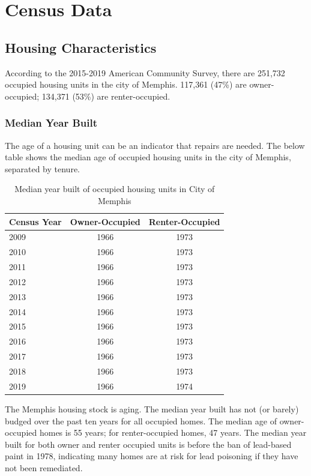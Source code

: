 \documentclass[
]{book}
\begin{document}
\hypertarget{census-data}{%
\chapter{Census Data}\label{census-data}}

\hypertarget{housing-characteristics}{%
\section{Housing Characteristics}\label{housing-characteristics}}

According to the 2015-2019 American Community Survey, there are 251,732 occupied housing units in the city of Memphis. 117,361 (47\%) are owner-occupied; 134,371 (53\%) are renter-occupied.

\hypertarget{median-year-built}{%
\subsection{Median Year Built}\label{median-year-built}}

The age of a housing unit can be an indicator that repairs are needed. The below table shows the median age of occupied housing units in the city of Memphis, separated by tenure.

\begin{table}

\caption{\label{tab:tbl-medyrbltmem}Median year built of occupied housing units in City of Memphis}
\centering
\begin{tabular}[t]{l|c|c}
\hline
Census Year & Owner-Occupied & Renter-Occupied\\
\hline
2009 & 1966 & 1973\\
\hline
2010 & 1966 & 1973\\
\hline
2011 & 1966 & 1973\\
\hline
2012 & 1966 & 1973\\
\hline
2013 & 1966 & 1973\\
\hline
2014 & 1966 & 1973\\
\hline
2015 & 1966 & 1973\\
\hline
2016 & 1966 & 1973\\
\hline
2017 & 1966 & 1973\\
\hline
2018 & 1966 & 1973\\
\hline
2019 & 1966 & 1974\\
\hline
\end{tabular}
\end{table}

The Memphis housing stock is aging. The median year built has not (or barely) budged over the past ten years for all occupied homes. The median age of owner-occupied homes is 55 years; for renter-occupied homes, 47 years. The median year built for both owner and renter occupied units is before the ban of lead-based paint in 1978, indicating many homes are at risk for lead poisoning if they have not been remediated.
\end{document}
